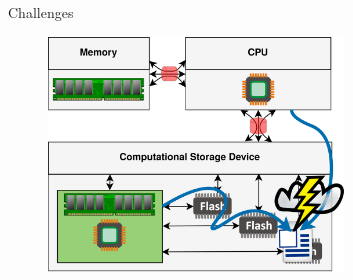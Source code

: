 \documentclass{beamer}
\begin{document}
\begin{frame}{Challenges}
	\begingroup
	\small
	\begin{figure}
		\centering
		\includegraphics[width=0.7\textwidth]{resources/images/challenges.png}
	\end{figure}
	\endgroup
\end{frame}

\end{document}
